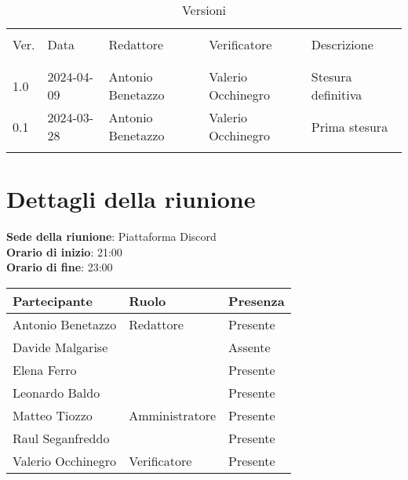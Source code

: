 \documentclass[italian,12pt]{article} %
\begin{document}


\newpage



\begin{table}[!h]
	\caption{Versioni}
	\footnotesize
	\begin{center}
		\begin{tabular}{ l l l l l }
			\hline                                                                          \\[-2ex]
			Ver. & Data       & Redattore         & Verificatore       & Descrizione        \\
			\\[-2ex] \hline \\[-1.5ex]
			1.0  & 2024-04-09 & Antonio Benetazzo & Valerio Occhinegro & Stesura definitiva \\
			0.1  & 2024-03-28 & Antonio Benetazzo & Valerio Occhinegro & Prima stesura      \\
			\\[-1.5ex] \hline
		\end{tabular}
	\end{center}
\end{table}

\newpage

\tableofcontents

\newpage

\section{Dettagli della riunione}


\textbf{Sede della riunione}: Piattaforma Discord\\
\textbf{Orario di inizio}: 21:00\\
\textbf{Orario di fine}: 23:00\\


\begin{flushleft}
	\begin{table}[!h]
		\begin{tabular}{ |l|l|l| }
			\hline
			\textbf{Partecipante} & \textbf{Ruolo} & \textbf{Presenza} \\
			\hline
			Antonio Benetazzo     & Redattore      & Presente          \\
			Davide Malgarise      &                & Assente           \\
			Elena Ferro           &                & Presente          \\
			Leonardo Baldo        &                & Presente          \\
			Matteo Tiozzo         & Amministratore & Presente          \\
			Raul Seganfreddo      &                & Presente          \\
			Valerio Occhinegro    & Verificatore   & Presente          \\
			\hline
		\end{tabular}
	\end{table}
\end{flushleft}
\end{document}
